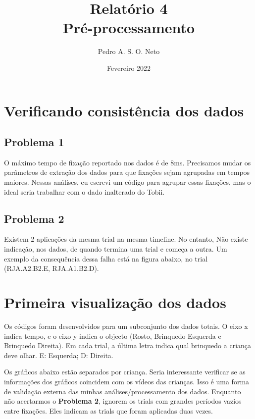 \documentclass{article}
\title{Relatório 4 \\ Pré-processamento}
\author{Pedro A. S. O. Neto}
\date{Fevereiro 2022}
\begin{document}
\maketitle

\section{Verificando consistência dos dados}

\subsection{Problema 1} 
O máximo tempo de fixação reportado nos dados é de 8ms. Precisamos mudar os parâmetros de extração dos dados para que fixações sejam agrupadas em tempos maiores. Nessas análises, eu escrevi um código para agrupar essas fixações, mas o ideal seria trabalhar com o dado inalterado do Tobii.

\subsection{Problema 2}
Existem 2 aplicações da mesma trial na mesma timeline. No entanto, Não existe indicação, nos dados, de quando termina uma trial e começa a outra. Um exemplo da consequência  dessa falha está na figura abaixo, no trial (RJA.A2.B2.E, RJA.A1.B2.D).

\section{Primeira visualização dos dados}

Os códigos foram desenvolvidos para um subconjunto dos dados totais. O eixo x indica tempo, e o eixo y indica o objecto (Rosto, Brinquedo Esquerda e Brinquedo Direita). Em cada trial, a última letra indica qual brinquedo a criança deve olhar. E: Esquerda; D: Direita.

Os gráficos abaixo estão separados por criança. Seria interessante verificar se as informações dos gráficos coincidem com os vídeos das crianças. Isso é uma forma de validação externa das minhas análises/processamento dos dados. Enquanto não acertarmos o \textbf{Problema 2}, ignorem os trials com grandes períodos vazios entre fixações. Eles indicam as trials que foram aplicadas duas vezes.
\end{document}
